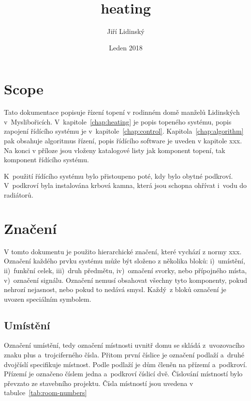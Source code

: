 \documentclass[a4paper,draft]{book}
\title{heating}
\author{Jiří Lidinský}
\date{Leden 2018}
\begin{document}
\frontmatter

\maketitle

\chapter*{Scope}

    Tato dokumentace popisuje řízení topení v rodinném domě manželů Lidinských
    v~Myslibořicích. V~kapitole~\ref{chap:heating} je popis topeného systému,
    popis zapojení řídícího systému je v~kapitole~\ref{chap:control}.
    Kapitola~\ref{chap:algorithm} pak obsahuje algoritmus řízení,
    popis řídícího software je uveden v kapitole xxx. Na konci v příloze jsou
    vloženy katalogové listy jak komponent topení, tak komponent řídícího
    systému.

    K~použití řídícího systému bylo přistoupeno poté, kdy bylo obytné podkroví.
    V~podkroví byla instalována krbová kamna, která jsou schopna ohřívat
    i~vodu do radiátorů.

\tableofcontents

\mainmatter

\chapter{Značení}

    V tomto dokumentu je použito hierarchické značení, které vychází z normy
    xxx. Označení každého prvku systému může být složeno z několika bloků:
    i)~umístění, ii)~funkční celek, iii)~druh předmětu, iv)~označení svorky,
    nebo přípojného místa, v)~označení signálu. Označení nemusí obsahovat
    všechny tyto komponenty, pokud nehrozí nejasnost, nebo pokud to nedává
    smysl. Každý~z bloků označení je uvozen speciálním symbolem.

\section{Umístění}

    Označení umístění, tedy označení místnosti uvnitř domu se skládá
    z~uvozovacího znaku plus a~trojciferného čísla. Přitom první číslice
    je označení podlaží a~druhé dvojčíslí specifikuje místnost. Podle podlaží
    je dům členěn na přízemí a~podkroví. Přízemí je označeno číslem jedna
    a~podkroví číslicí dvě. Číslování místností bylo převzato ze stavebního
    projektu. Čísla místností jsou uvedena v tabulce~\ref{tab:room-numbers}
\end{document}
